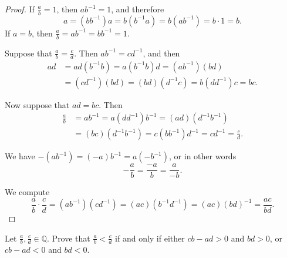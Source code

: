 \begin{proof}
	\hfill

	If $\frac{a}{b} = 1$, then $a b^{-1} = 1$, and therefore
	$$
		a = (b b^{-1}) a = b (b^{-1} a) = b (a b^{-1}) = b \cdot 1 = b.
	$$
	If $a = b$, then $\frac{a}{b} = a b^{-1} = b b^{-1} = 1$.

	Suppose that $\frac{a}{b} = \frac{c}{d}$. Then $a b^{-1} = c d^{-1}$, and then
	\begin{align*}
		a d & = a d (b^{-1} b) = a (b^{-1} b) d = (a b^{-1})(b d)         \\
		    & = (c d^{-1})(b d) = (b d)(d^{-1} c) = b (d d^{-1}) c = b c.
	\end{align*}

	Now suppose that $a d = b c$. Then
	\begin{align*}
		\frac{a}{b} & = a b^{-1} = a (d d^{-1}) b^{-1} = (a d)(d^{-1} b^{-1})                \\
		            & = (b c)(d^{-1} b^{-1}) = c (b b^{-1}) d^{-1} = c d^{-1} = \frac{c}{d}.
	\end{align*}

	We have $-(a b^{-1}) = (-a)b^{-1} = a(-b^{-1})$, or in other words
	$$
		-\frac{a}{b} = \frac{-a}{b} = \frac{a}{-b}.
	$$

	We compute
	$$
		\frac{a}{b} \cdot \frac{c}{d} = (a b^{-1})(c d^{-1}) = (a c)(b^{-1} d^{-1}) = (a c)(b d)^{-1} = \frac{a c}{b d}.
	$$
\end{proof}


\Newpage
\begin{exercise} %
	Let $\frac{a}{b}, \frac{c}{d} \in \mathbb{Q}$. Prove that $\frac{a}{b} < \frac{c}{d}$ if and only if either $c b - a d > 0$ and $b d > 0$, or $c b - a d < 0$ and $b d < 0$.
\end{exercise}

